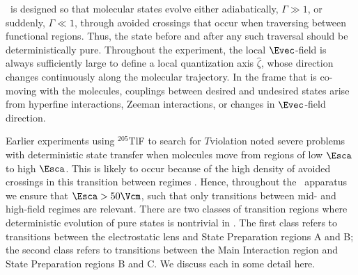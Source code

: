 \CENTREX\ is designed so that molecular states evolve either adiabatically, $\Gamma \gg 1$, or suddenly, $\Gamma \ll 1$, through avoided crossings that occur when traversing between functional regions. Thus, the state before and after any such traversal should be deterministically pure. Throughout the experiment, the local $\Evec$-field is always sufficiently large to define a local quantization axis $\hat{\zeta}$, whose direction changes continuously along the molecular trajectory.  In the frame that is co-moving with the molecules, couplings between desired and undesired states arise from hyperfine interactions, Zeeman interactions, or changes in $\Evec$-field direction.  

Earlier experiments using $^{205}$TlF to search for $T$\hyph violation noted severe problems with deterministic state transfer when molecules move from regions of low $\Esca$ to high $\Esca$. This is likely to occur because of the high density of avoided crossings in this transition between regimes \cite{cho1991search,wilkening1984search}.  Hence, throughout the \CENTREX\ apparatus we ensure that $\Esca > 50 \Vcm$, such that only transitions between mid- and high-field regimes are relevant. There are two classes of transition regions where deterministic evolution of pure states is nontrivial in \CENTREX. The first class refers to transitions between the electrostatic lens and State Preparation regions A and B; the second class refers to transitions between the Main Interaction region and State Preparation regions B and C. We discuss each in some detail here.

